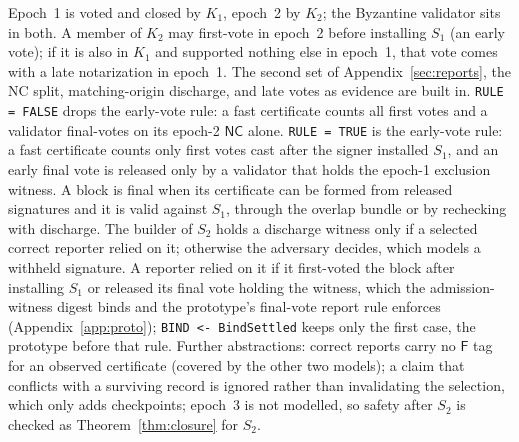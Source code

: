 \documentclass[conference]{IEEEtran}
\newcommand{\NC}{\mathsf{NC}}
\newcommand{\tagF}{\mathsf{F}}
\begin{document}
Epoch~1 is voted and closed by $K_1$, epoch~2 by $K_2$; the Byzantine validator sits in both. A member of $K_2$ may first-vote in epoch~2 before installing $S_1$ (an early vote); if it is also in $K_1$ and supported nothing else in epoch~1, that vote comes with a late notarization in epoch~1. The second set of Appendix~\ref{sec:reports}, the NC split, matching-origin discharge, and late votes as evidence are built in. \texttt{RULE = FALSE} drops the early-vote rule: a fast certificate counts all first votes and a validator final-votes on its epoch-2 $\NC$ alone. \texttt{RULE = TRUE} is the early-vote rule: a fast certificate counts only first votes cast after the signer installed $S_1$, and an early final vote is released only by a validator that holds the epoch-1 exclusion witness. A block is final when its certificate can be formed from released signatures and it is valid against $S_1$, through the overlap bundle or by rechecking with discharge. The builder of $S_2$ holds a discharge witness only if a selected correct reporter relied on it; otherwise the adversary decides, which models a withheld signature. A reporter relied on it if it first-voted the block after installing $S_1$ or released its final vote holding the witness, which the admission-witness digest binds and the prototype's final-vote report rule enforces (Appendix~\ref{app:proto}); \texttt{BIND <- BindSettled} keeps only the first case, the prototype before that rule. Further abstractions: correct reports carry no $\tagF$ tag for an observed certificate (covered by the other two models); a claim that conflicts with a surviving record is ignored rather than invalidating the selection, which only adds checkpoints; epoch~3 is not modelled, so safety after $S_2$ is checked as Theorem~\ref{thm:closure} for $S_2$.
\end{document}
